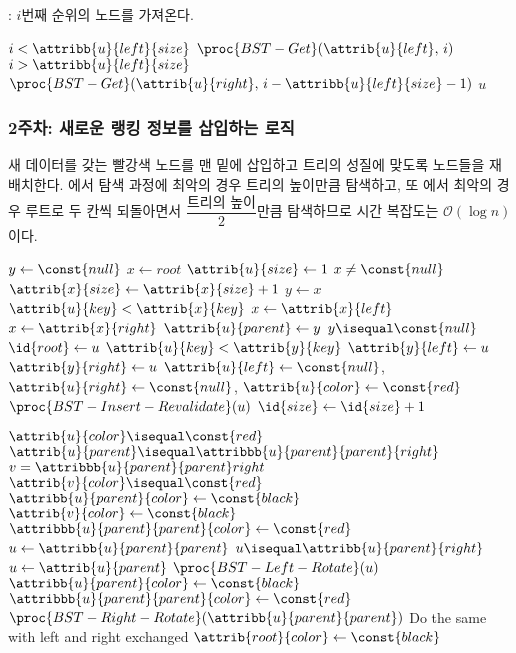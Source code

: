 : $i$번째 순위의 노드를 가져온다.

\begin{codebox}
\li \If $i < \attribb{u}{left}{size}$ \Then
\li     \Return $\proc{BST-Get}(\attrib{u}{left},\,i)$
\li \ElseIf $i > \attribb{u}{left}{size}$ \Then
\li     \Return $\proc{BST-Get}(\attrib{u}{right},\,i-\attribb{u}{left}{size}-1)$
\li \ElseNoIf
\li     \Return $u$
    \End
\end{codebox}

\subsubsection{2주차: 새로운 랭킹 정보를 삽입하는 로직} 새 데이터를 갖는 빨강색 노드를 맨 밑에 삽입하고 트리의 성질에 맞도록 노드들을 재배치한다.
에서 탐색 과정에 최악의 경우 트리의 높이만큼 탐색하고, 또 에서 최악의 경우
루트로 두 칸씩 되돌아면서 $\dfrac{\mbox{트리의 높이}}{2}$만큼 탐색하므로 시간 복잡도는 $\mathcal{O}\left(\log n\right)$이다.

\begin{codebox}
\li $y \gets \const{null}$
\li $x \gets root$
\li $\attrib{u}{size} \gets 1$
\li \While $x \neq \const{null}$ \Do
\li     $\attrib{x}{size} \gets \attrib{x}{size} + 1$
\li     $y \gets x$
\li     \If $\attrib{u}{key} < \attrib{x}{key}$ \Then
\li         $x \gets \attrib{x}{left}$
\li     \ElseNoIf
\li         $x \gets \attrib{x}{right}$
        \End
    \End
\li $\attrib{u}{parent} \gets y$
\li \If $y \isequal \const{null}$ \Then
\li     $\id{root} \gets u$
\li \ElseIf $\attrib{u}{key} < \attrib{y}{key}$ \Then
\li     $\attrib{y}{left} \gets u$
\li \ElseNoIf
\li     $\attrib{y}{right} \gets u$
    \End
\li $\attrib{u}{left} \gets \const{null}$, $\attrib{u}{right} \gets \const{null}$, $\attrib{u}{color} \gets \const{red}$ 
\li $\proc{BST-Insert-Revalidate}(u)$
\li $\id{size} \gets \id{size} + 1$
\end{codebox}

\begin{codebox}
\li \While $\attrib{u}{color} \isequal \const{red}$ \Do
\li     \If $\attrib{u}{parent} \isequal \attribbb{u}{parent}{parent}{right}$ \Then
\li         $v = \attribbb{u}{parent}{parent}right$
\li         \If $\attrib{v}{color} \isequal \const{red}$ \Then
\li             $\attribb{u}{parent}{color} \gets \const{black}$
\li             $\attrib{v}{color} \gets \const{black}$
\li             $\attribbb{u}{parent}{parent}{color} \gets \const{red}$
\li             $u \gets \attribb{u}{parent}{parent}$
\li         \ElseNoIf
\li             \If $u \isequal \attribb{u}{parent}{right}$ \Then
\li                 $u \gets \attrib{u}{parent}$
\li                 $\proc{BST-Left-Rotate}(u)$
                \End
\li             $\attribb{u}{parent}{color} \gets \const{black}$
\li             $\attribbb{u}{parent}{parent}{color} \gets \const{red}$
\li             $\proc{BST-Right-Rotate}(\attribb{u}{parent}{parent})$
            \End
\li     \ElseNoIf
\li         Do the same with left and right exchanged
        \End
    \End
\li $\attrib{root}{color} \gets \const{black}$
\end{codebox}

